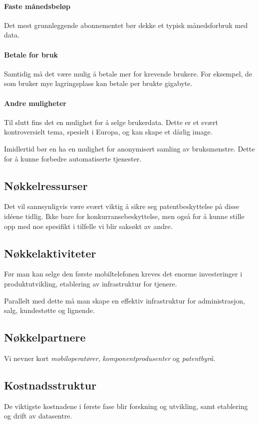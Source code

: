 \paragraph{Faste månedsbeløp}
Det mest grunnleggende abonnementet bør dekke et typisk månedsforbruk med data.

\paragraph{Betale for bruk}
Samtidig må det være mulig å betale mer for krevende brukere. For eksempel, de
som bruker mye lagringsplass kan betale per brukte gigabyte.

\paragraph{Andre muligheter}
Til slutt fins det en mulighet for å selge brukerdata. Dette er et svært
kontroversielt tema, spesielt i Europa, og kan skape et dårlig image.

Imidlertid bør en ha en mulighet for anonymisert samling av bruksmønstre. Dette
for å kunne forbedre automatiserte tjenester.

\subsection{Nøkkelressurser}

Det vil sannsynligvis være svært viktig å sikre seg patentbeskyttelse på disse
idéene tidlig. Ikke bare for konkurransebeskyttelse, men også for å kunne
stille opp med noe spesifikt i tilfelle vi blir saksøkt av andre.

\subsection{Nøkkelaktiviteter}

Før man kan selge den første mobiltelefonen kreves det enorme investeringer i
produktutvikling, etablering av infrastruktur for tjenere.

Parallelt med dette må man skape en effektiv infrastruktur for administrasjon,
salg, kundestøtte og lignende.

\subsection{Nøkkelpartnere}

Vi nevner kort \textit{mobiloperatører}, \textit{komponentprodusenter} og
\textit{patentbyrå}.

\subsection{Kostnadsstruktur}

De viktigste kostnadene i første fase blir forskning og utvikling, samt
etablering og drift av datasentre.

